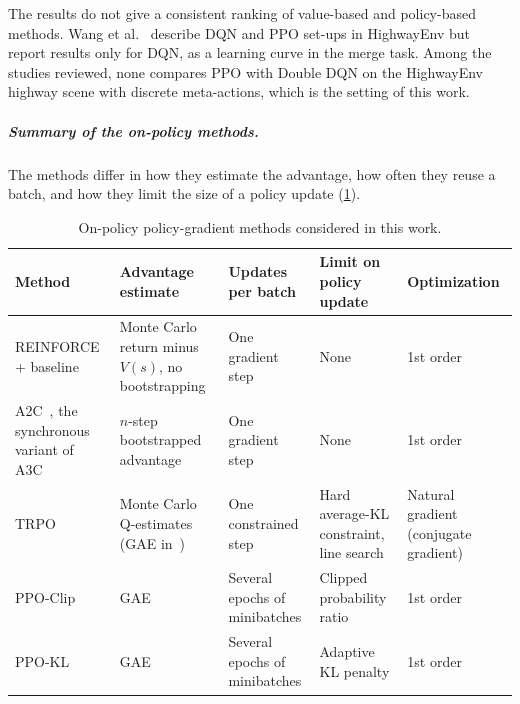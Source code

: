The results do not give a consistent ranking of value-based and policy-based methods. Wang et
al.~\cite{wang2024autonomous} describe DQN and PPO set-ups in HighwayEnv but report results only for DQN, as a learning
curve in the merge task. Among the studies reviewed, none compares PPO with Double DQN on the HighwayEnv highway scene
with discrete meta-actions, which is the setting of this work.

\subparagraph{Summary of the on-policy methods.}
The methods differ in how they estimate the advantage, how often they reuse a batch, and how they limit the size of a
policy update (\cref{tab:ppo-sota-methods}).

\begin{table}[H]
  \centering
  \small
  \caption{On-policy policy-gradient methods considered in this work.}
  \label{tab:ppo-sota-methods}
  \begin{tabularx}{\linewidth}{@{}*{5}{>{\raggedright\arraybackslash}X}@{}}
    \toprule
    Method & Advantage estimate & Updates per batch & Limit on policy update & Optimization \\
    \midrule
    REINFORCE + baseline~\cite{williams1992reinforce}
      & Monte Carlo return minus $V(s)$, no bootstrapping & One gradient step & None & 1st order \\
    A2C~\cite{wu2017acktr}, the synchronous variant of A3C~\cite{mnih2016a3c}
      & $n$-step bootstrapped advantage & One gradient step & None & 1st order \\
    TRPO~\cite{schulman2015trpo}
      & Monte Carlo Q-estimates (GAE in~\cite{schulman2016gae}) & One constrained step
      & Hard average-KL constraint, line search & Natural gradient (conjugate gradient) \\
    PPO-Clip~\cite{schulman2017ppo}
      & GAE & Several epochs of minibatches & Clipped probability ratio & 1st order \\
    PPO-KL~\cite{schulman2017ppo}
      & GAE & Several epochs of minibatches & Adaptive KL penalty & 1st order \\
    \bottomrule
  \end{tabularx}
\end{table}

